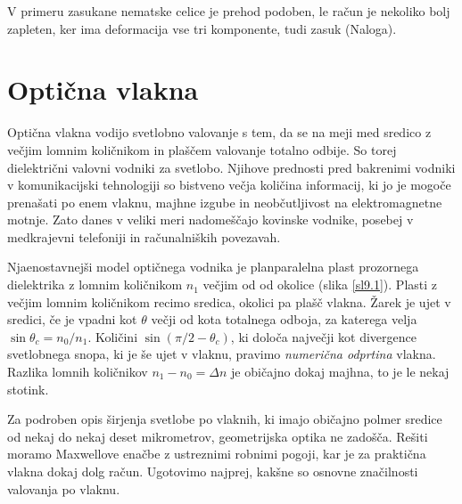 \documentclass[11pt,fleqn]{book} %
\begin{document}
V primeru zasukane nematske celice je prehod podoben, le račun je
nekoliko bolj zapleten, ker ima deformacija vse tri komponente, tudi
zasuk (Naloga).


\chapter{Optična vlakna}

Optična vlakna vodijo svetlobno valovanje s tem, da se na meji med
sredico z večjim lomnim količnikom in plaščem valovanje totalno odbije.
So torej dielektrični valovni vodniki za svetlobo. Njihove prednosti
pred bakrenimi vodniki v komunikacijski tehnologiji so bistveno večja
količina informacij, ki jo je mogoče prenašati po enem vlaknu, majhne
izgube in neobčutljivost na elektromagnetne motnje. Zato danes v veliki
meri nadomeščajo kovinske vodnike, posebej v medkrajevni telefoniji
in računalniških povezavah.

% 
% 
% 
% 


Njaenostavnejši model optičnega vodnika je planparalelna plast prozornega
dielektrika z lomnim količnikom $n_{1}$ večjim od od okolice (slika
\ref{sl9.1}). Plasti z večjim lomnim količnikom recimo sredica, okolici
pa plašč vlakna. Žarek je ujet v sredici, če je vpadni kot $\theta$
večji od kota totalnega odboja, za katerega velja $\sin\theta_{c}=n_{0}/n_{1}$.
Količini $\sin\left(\pi/2-\theta_{c}\right)$, ki določa največji
kot divergence svetlobnega snopa, ki je še ujet v vlaknu, pravimo
\textit{numerična odprtina }vlakna. Razlika lomnih količnikov $n_{1}-n_{0}=\Delta n$
je običajno dokaj majhna, to je le nekaj stotink.

Za podroben opis širjenja svetlobe po vlaknih, ki imajo običajno polmer
sredice od nekaj do nekaj deset mikrometrov, geometrijska optika ne
zadošča. Rešiti moramo Maxwellove enačbe z ustreznimi robnimi pogoji,
kar je za praktična vlakna dokaj dolg račun. Ugotovimo najprej, kakšne
so osnovne značilnosti valovanja po vlaknu.
\end{document}
